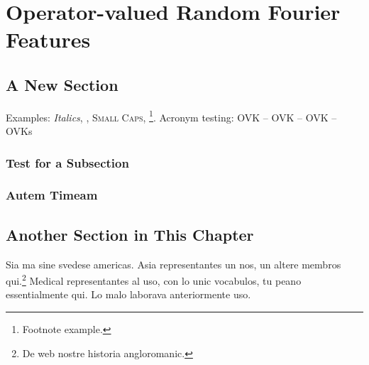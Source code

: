 
\chapter{Operator-valued Random Fourier Features} %

\label{ch:examples} %


\lipsum[1]


\section{A New Section}

\lipsum[2]

Examples: \textit{Italics}, , \textsc{Small Caps}, \footnote{Footnote example.}.
Acronym testing: \ac{OVK} -- \acs{OVK} -- \acf{OVK} -- \acp{OVK}


\subsection{Test for a Subsection}

\lipsum[3-5]


\subsection{Autem Timeam}

\lipsum[6]


\section{Another Section in This Chapter}

\lipsum[7]

Sia ma sine svedese americas. Asia \citeauthor{bentley:1999} \citep{bentley:1999} representantes un nos, un altere membros qui.\footnote{De web nostre historia angloromanic.} Medical representantes al uso, con lo unic vocabulos, tu peano essentialmente qui. Lo malo laborava anteriormente uso.

